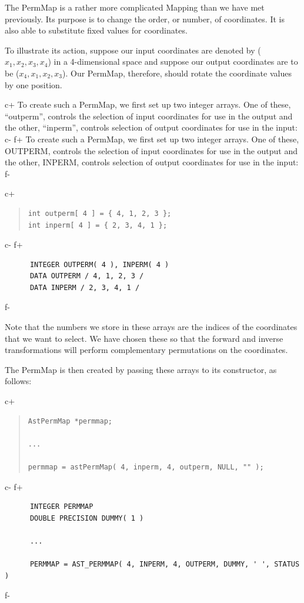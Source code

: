 \documentclass[twoside,11pt]{article}
\begin{document}
The PermMap is a rather more complicated Mapping than we have met
previously.  Its purpose is to change the order, or number, of
coordinates. It is also able to substitute fixed values for
coordinates.

To illustrate its action, suppose our input coordinates are denoted by
($x_1,x_2,x_3,x_4$) in a 4-dimensional space and suppose our output
coordinates are to be ($x_4,x_1,x_2,x_3$). Our PermMap, therefore,
should rotate the coordinate values by one position.

c+
To create such a PermMap, we first set up two integer arrays. One of
these, ``outperm'', controls the selection of input coordinates for
use in the output and the other, ``inperm'', controls selection of
output coordinates for use in the input:
c-
f+
To create such a PermMap, we first set up two integer arrays. One of
these, OUTPERM, controls the selection of input coordinates for use in
the output and the other, INPERM, controls selection of output
coordinates for use in the input:
f-

c+
\begin{quote}
\small
\begin{verbatim}
int outperm[ 4 ] = { 4, 1, 2, 3 };
int inperm[ 4 ] = { 2, 3, 4, 1 };
\end{verbatim}
\normalsize
\end{quote}
c-
f+
\small
\begin{verbatim}
      INTEGER OUTPERM( 4 ), INPERM( 4 )
      DATA OUTPERM / 4, 1, 2, 3 /
      DATA INPERM / 2, 3, 4, 1 /
\end{verbatim}
\normalsize
f-

Note that the numbers we store in these arrays are the indices of the
coordinates that we want to select. We have chosen these so that the
forward and inverse transformations will perform complementary
permutations on the coordinates.

The PermMap is then created by passing these arrays to its
constructor, as follows:

c+
\begin{quote}
\small
\begin{verbatim}
AstPermMap *permmap;

...

permmap = astPermMap( 4, inperm, 4, outperm, NULL, "" );
\end{verbatim}
\normalsize
\end{quote}
c-
f+
\small
\begin{verbatim}
      INTEGER PERMMAP
      DOUBLE PRECISION DUMMY( 1 )

      ...

      PERMMAP = AST_PERMMAP( 4, INPERM, 4, OUTPERM, DUMMY, ' ', STATUS )
\end{verbatim}
\normalsize
f-
\end{document}
